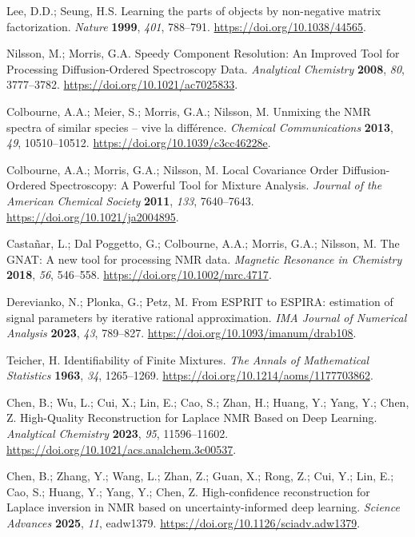 Lee, D.D.; Seung, H.S. Learning the parts of objects by non-negative matrix factorization. \emph{Nature} \textbf{1999}, \emph{401}, 788--791. \url{https://doi.org/10.1038/44565}.

Nilsson, M.; Morris, G.A. Speedy Component Resolution: An Improved Tool for Processing Diffusion-Ordered Spectroscopy Data. \emph{Analytical Chemistry} \textbf{2008}, \emph{80}, 3777--3782. \url{https://doi.org/10.1021/ac7025833}.

Colbourne, A.A.; Meier, S.; Morris, G.A.; Nilsson, M. Unmixing the NMR spectra of similar species -- vive la différence. \emph{Chemical Communications} \textbf{2013}, \emph{49}, 10510--10512. \url{https://doi.org/10.1039/c3cc46228e}.

Colbourne, A.A.; Morris, G.A.; Nilsson, M. Local Covariance Order Diffusion-Ordered Spectroscopy: A Powerful Tool for Mixture Analysis. \emph{Journal of the American Chemical Society} \textbf{2011}, \emph{133}, 7640--7643. \url{https://doi.org/10.1021/ja2004895}.

Castañar, L.; Dal Poggetto, G.; Colbourne, A.A.; Morris, G.A.; Nilsson, M. The GNAT: A new tool for processing NMR data. \emph{Magnetic Resonance in Chemistry} \textbf{2018}, \emph{56}, 546--558. \url{https://doi.org/10.1002/mrc.4717}.

Derevianko, N.; Plonka, G.; Petz, M. From ESPRIT to ESPIRA: estimation of signal parameters by iterative rational approximation. \emph{IMA Journal of Numerical Analysis} \textbf{2023}, \emph{43}, 789--827. \url{https://doi.org/10.1093/imanum/drab108}.

Teicher, H. Identifiability of Finite Mixtures. \emph{The Annals of Mathematical Statistics} \textbf{1963}, \emph{34}, 1265--1269. \url{https://doi.org/10.1214/aoms/1177703862}.

Chen, B.; Wu, L.; Cui, X.; Lin, E.; Cao, S.; Zhan, H.; Huang, Y.; Yang, Y.; Chen, Z. High-Quality Reconstruction for Laplace NMR Based on Deep Learning. \emph{Analytical Chemistry} \textbf{2023}, \emph{95}, 11596--11602. \url{https://doi.org/10.1021/acs.analchem.3c00537}.

Chen, B.; Zhang, Y.; Wang, L.; Zhan, Z.; Guan, X.; Rong, Z.; Cui, Y.; Lin, E.; Cao, S.; Huang, Y.; Yang, Y.; Chen, Z. High-confidence reconstruction for Laplace inversion in NMR based on uncertainty-informed deep learning. \emph{Science Advances} \textbf{2025}, \emph{11}, eadw1379. \url{https://doi.org/10.1126/sciadv.adw1379}.

